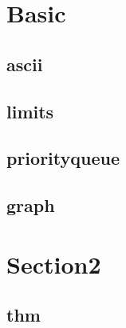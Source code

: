 \section{Basic}
    \subsection{ascii}
        
    \subsection{limits}
        
    \subsection{priorityqueue}
        
    \subsection{graph}
        

\section{Section2}
    \subsection{thm}
        